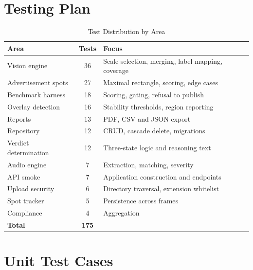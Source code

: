 \documentclass[
12pt,
a4paper,
oneside
]{report}
\begin{document}
\section{Testing Plan}

\begin{table}[H]
\centering
\begin{tabular}{|p{4.6cm}|c|p{6cm}|}
\hline
\textbf{Area} & \textbf{Tests} & \textbf{Focus} \\
\hline
Vision engine & 36 & Scale selection, merging, label mapping, coverage \\
\hline
Advertisement spots & 27 & Maximal rectangle, scoring, edge cases \\
\hline
Benchmark harness & 18 & Scoring, gating, refusal to publish \\
\hline
Overlay detection & 16 & Stability thresholds, region reporting \\
\hline
Reports & 13 & PDF, CSV and JSON export \\
\hline
Repository & 12 & CRUD, cascade delete, migrations \\
\hline
Verdict determination & 12 & Three-state logic and reasoning text \\
\hline
Audio engine & 7 & Extraction, matching, severity \\
\hline
API smoke & 7 & Application construction and endpoints \\
\hline
Upload security & 6 & Directory traversal, extension whitelist \\
\hline
Spot tracker & 5 & Persistence across frames \\
\hline
Compliance & 4 & Aggregation \\
\hline
\textbf{Total} & \textbf{175} & \\
\hline
\end{tabular}
\caption{Test Distribution by Area}
\end{table}

\section{Unit Test Cases}
\end{document}
